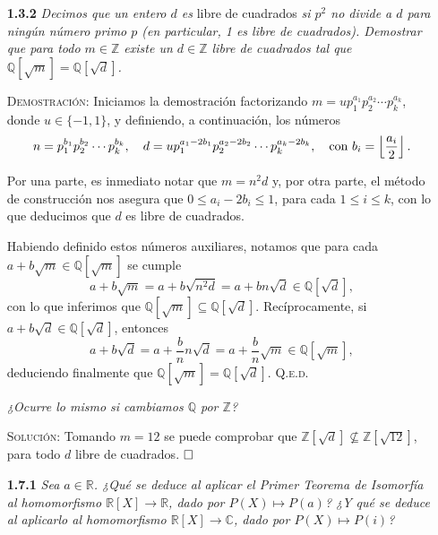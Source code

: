 \documentclass{article}
\begin{document}
\begin{enumerate}
    \vspace{12px}

    \item[\textbf{1.3.2}] \textit{Decimos que un entero $d$ es} libre de cuadrados \textit{si $p^2$ no divide a $d$ para ningún número primo $p$ (en particular, 1 es libre de cuadrados). Demostrar que para todo $m \in \mathbb{Z}$ existe un $d \in \mathbb{Z}$ libre de cuadrados tal que $\mathbb{Q}[\sqrt{m}] = \mathbb{Q}[\sqrt{d}]$.}
    
    \vspace{7px}

    \textsc{Demostración}: Iniciamos la demostración factorizando $m = up_1^{a_1}p_2^{a_2}\cdots p_k^{a_k}$, donde $u \in \{-1, 1\}$, y definiendo, a continuación, los números \[n = p_1^{b_1}p_2^{b_2}\cdots p_k^{b_k}, \hspace{10px} d = up_1^{a_1 - 2b_1}p_2^{a_2 - 2b_2}\cdots p_k^{a_k - 2b_k}, \hspace{10px} \text{con } b_i = \left\lfloor \frac{a_i}{2}\right\rfloor.\]

    Por una parte, es inmediato notar que $m = n^2d$ y, por otra parte, el método de construcción nos asegura que $0 \leq a_i - 2b_i \leq 1$, para cada $1 \leq i \leq k$, con lo que deducimos que $d$ es libre de cuadrados.

    Habiendo definido estos números auxiliares, notamos que para cada $a + b\sqrt{m} \in \mathbb{Q}[\sqrt{m}]$ se cumple \[a + b\sqrt{m} = a + b\sqrt{n^2d} = a + bn\sqrt{d} \in \mathbb{Q}[\sqrt{d}],\] con lo que inferimos que $\mathbb{Q}[\sqrt{m}] \subseteq \mathbb{Q}[\sqrt{d}]$. Recíprocamente, si $a + b\sqrt{d} \in \mathbb{Q}[\sqrt{d}]$, entonces \[a + b\sqrt{d} = a + \frac{b}{n}n\sqrt{d} = a + \frac{b}{n}\sqrt{m} \in \mathbb{Q}[\sqrt{m}],\] deduciendo finalmente que $\mathbb{Q}[\sqrt{m}] = \mathbb{Q}[\sqrt{d}]$. \hfill{\textsc{Q.e.d.}}

    \vspace{7px}

    \textit{¿Ocurre lo mismo si cambiamos $\mathbb{Q}$ por $\mathbb{Z}$?}

    \vspace{7px}

    \textsc{Solución}: Tomando $m = 12$ se puede comprobar que $\mathbb{Z}[\sqrt{d}] \not\subseteq \mathbb{Z}[\sqrt{12}]$, para todo $d$ libre de cuadrados. $\hfill\square$

    \newpage

    \item[\textbf{1.7.1}] \textit{Sea $a \in \mathbb{R}$. ¿Qué se deduce al aplicar el Primer Teorema de Isomorfía al homomorfismo $\mathbb{R}[X] \to \mathbb{R}$, dado por $P(X) \mapsto P(a)$? ¿Y qué se deduce al aplicarlo al homomorfismo $\mathbb{R}[X] \to \mathbb{C}$, dado por $P(X) \mapsto P(i)$?}


\end{enumerate}
\end{document}
